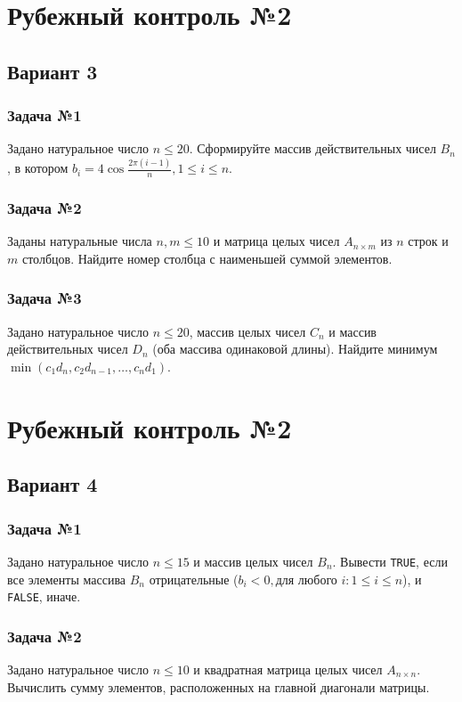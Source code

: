 \documentclass[12pt,a5paper,landscape]{report}
\begin{document}
\clearpage
\section*{Рубежный контроль №2}
\subsection*{Вариант 3}
\subsubsection*{Задача №1}
Задано натуральное число $n \le 20$. Сформируйте массив действительных чисел $B_n$, в котором $b_i = 4 \cos { \frac {2\pi(i-1)} {n} }, 1 \le i \le n$.
\subsubsection*{Задача №2}
Заданы натуральные числа $n, m \le 10$ и матрица целых чисел $A_{n \times m}$ из $n$ строк и $m$ столбцов. Найдите номер столбца с наименьшей суммой элементов.
\subsubsection*{Задача №3}
Задано натуральное число $n \le 20$, массив целых чисел $C_n$ и массив действительных чисел $D_n$ (оба массива одинаковой длины). Найдите минимум $\min({ c_1 d_n, c_2 d_{n-1}, \ldots, c_n d_1 })$.


\clearpage
\section*{Рубежный контроль №2}
\subsection*{Вариант 4}
\subsubsection*{Задача №1}
Задано натуральное число $n \le 15$ и массив целых чисел $B_n$. Вывести \texttt{TRUE}, если все элементы массива $B_n$ отрицательные ($b_i < 0, \text{для любого }i: 1 \le i \le n$), и \texttt{FALSE}, иначе.
\subsubsection*{Задача №2}
Задано натуральное число $n \le 10$ и квадратная матрица целых чисел $A_{n \times n}$. Вычислить сумму элементов, расположенных на главной диагонали матрицы.
\end{document}
